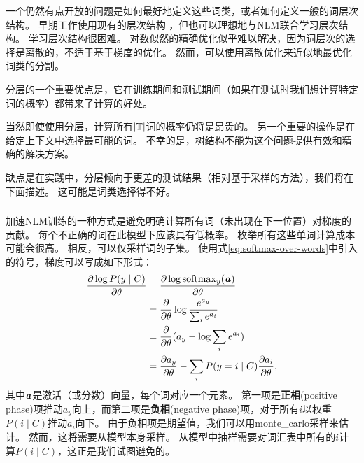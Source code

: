 
一个仍然有点开放的问题是如何最好地定义这些词类，或者如何定义一般的词层次结构。
早期工作使用现有的层次结构\citep{Morin+Bengio-2005-small} ，但也可以理想地与\gls{NLM}联合学习层次结构。
学习层次结构很困难。
对数似然的精确优化似乎难以解决，因为词层次的选择是离散的，不适于基于梯度的优化。
然而，可以使用离散优化来近似地最优化词类的分割。

分层的一个重要优点是，它在训练期间和测试期间（如果在测试时我们想计算特定词的概率）都带来了计算的好处。

当然即使使用分层，计算所有$|\mathbb{T}|$词的概率仍将是昂贵的。
另一个重要的操作是在给定上下文中选择最可能的词。
不幸的是，树结构不能为这个问题提供有效和精确的解决方案。

缺点是在实践中，分层倾向于更差的测试结果（相对基于采样的方法），我们将在下面描述。
这可能是词类选择得不好。

\subsubsection{}
\label{sec:importance_sampling_chap12}
加速\gls{NLM}训练的一种方式是避免明确计算所有词（未出现在下一位置）对梯度的贡献。
每个不正确的词在此模型下应该具有低概率。
枚举所有这些单词计算成本可能会很高。
相反，可以仅采样词的子集。
使用式\eqref{eq:softmax-over-words}中引入的符号，梯度可以写成如下形式：
\begin{align}
 \frac{\partial \log P(y \mid C)}{\partial \theta} &= \frac{\partial \log {\rm softmax}_y(\boldsymbol{\mathit{a}})}{\partial \theta} \\ 
  &= \frac{\partial}{\partial \theta} \log \frac{e^{a_y}}{\sum_i e^{a_i}} \\ 
 &= \frac{\partial}{\partial \theta} (a_y - \log \sum_i e^{a_i}) \\ 
 &= \frac{\partial a_y}{\partial \theta}  - \sum_i P(y = i \mid C) \frac{\partial a_i}{\partial \theta},
\end{align}
其中$\boldsymbol{\mathit{a}}$是激活（或分数）向量，每个词对应一个元素。
第一项是\textbf{正相}(positive phase)项推动$a_y$向上，而第二项是\textbf{负相}(negative phase)项，对于所有$i$以权重$P(i \mid C)$推动$a_i$向下。
由于负相项是期望值，我们可以用\gls{monte_carlo}采样来估计。
然而，这将需要从模型本身采样。
从模型中抽样需要对词汇表中所有的$i$计算$P(i \mid C)$，这正是我们试图避免的。

